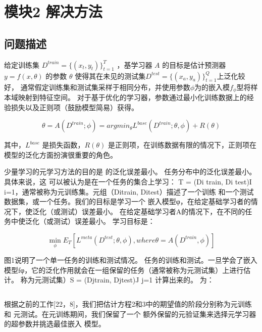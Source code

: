 \chapter{模块2 解决方法}

\section{问题描述}

给定训练集 $D^{train} = \{(x_t,y_t)\}^{T}_{t=1}$ ，基学习器 $A$ 的目标是估计预测器 $y=f(x,\theta) $
的参数 $\theta$ 使得其在未见的测试集$D^{test} = \{(x_a, y_a)\}^{Q}_{t=1}$上泛化较好，
通常假定训练集和测试集采样于相同分布，并使用参数$\phi$为的嵌入模$f_{\phi}$型将样本域映射到特征空间。
对于基于优化的学习器，参数通过最小化训练数据上的经验损失以及正则项（鼓励模型简易）获得。

\begin{equation}
    \theta = A(D^{train}; \phi) = argmin_{\theta}L^{base}(D^{train}; \theta, \phi) + R(\theta)
\end{equation}

其中，$L^{base}$ 是损失函数，$R(\theta)$ 是正则项，在训练数据有限的情况下，正则项在模型的泛化方面扮演很重要的角色。

少量学习的元学习方法的目的是
的泛化误差最小。
任务分布中的泛化误差最小。具体来说，这
可以被认为是在一个任务的集合上学习：
T = {(Di train, Di test)}I i=1，通常被称为元训练集。元组（Ditrain, Ditest）描述了一个训练
和一个测试数据集，或一个任务。我们的目标是学习一个
嵌入模型φ，在给定基础学习者的情况下，使泛化（或测试）误差最小。
在给定基础学习者A的情况下，在不同的任务中使泛化（或测试）误差最小。
学习目标是：

\begin{equation}
    \min_{\phi} E_{T} [L^{meta}(D^{test}; \theta, \phi), where \theta = A(D^{train}, \phi)]
\end{equation}

图1说明了一个单一任务的训练和测试情况。
任务的训练和测试。一旦学会了嵌入模型fφ，它的泛化作用就会在一组保留的任务（通常被称为元测试集）上进行估计。
称为元测试集）S = {(Djtrain, Djtest)}J j=1 计算出来的。
为：

\begin{equation}
    
\end{equation}

根据之前的工作[22，8]，我们把估计方程2和3中的期望值的阶段分别称为元训练和
元测试。在元训练期间，我们保留了一个
额外保留的元验证集来选择元学习器的超参数并挑选最佳嵌入
模型。

